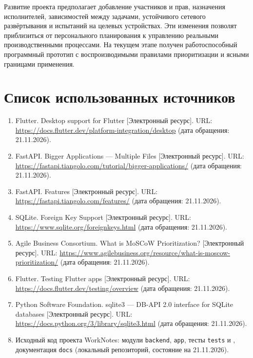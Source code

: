 \documentclass[14pt,a4paper]{extarticle}
\providecommand{\tightlist}{\setlength{\itemsep}{0pt}\setlength{\parskip}{0pt}}
\begin{document}
Развитие проекта предполагает добавление участников и прав, назначения исполнителей, зависимостей между задачами, устойчивого сетевого развёртывания и испытаний на целевых устройствах. Эти изменения позволят приблизиться от персонального планирования к управлению реальными производственными процессами. На текущем этапе получен работоспособный программный прототип с воспроизводимыми правилами приоритизации и ясными границами применения.

\section*{Список использованных источников}

\begin{enumerate}
\def\labelenumi{\arabic{enumi}.}
\tightlist
\item
  Flutter. Desktop support for Flutter {[}Электронный ресурс{]}. URL: \url{https://docs.flutter.dev/platform-integration/desktop} (дата обращения: 21.11.2026).
\item
  FastAPI. Bigger Applications --- Multiple Files {[}Электронный ресурс{]}. URL: \url{https://fastapi.tiangolo.com/tutorial/bigger-applications/} (дата обращения: 21.11.2026).
\item
  FastAPI. Features {[}Электронный ресурс{]}. URL: \url{https://fastapi.tiangolo.com/features/} (дата обращения: 21.11.2026).
\item
  SQLite. Foreign Key Support {[}Электронный ресурс{]}. URL: \url{https://www.sqlite.org/foreignkeys.html} (дата обращения: 21.11.2026).
\item
  Agile Business Consortium. What is MoSCoW Prioritization? {[}Электронный ресурс{]}. URL: \url{https://www.agilebusiness.org/resource/what-is-moscow-prioritization/} (дата обращения: 21.11.2026).
\item
  Flutter. Testing Flutter apps {[}Электронный ресурс{]}. URL: \url{https://docs.flutter.dev/testing/overview} (дата обращения: 21.11.2026).
\item
  Python Software Foundation. sqlite3 --- DB-API 2.0 interface for SQLite databases {[}Электронный ресурс{]}. URL: \url{https://docs.python.org/3/library/sqlite3.html} (дата обращения: 21.11.2026).
\item
  Исходный код проекта WorkNotes: модули \texttt{backend}, \texttt{app}, тесты \texttt{tests} и , документация \texttt{docs} (локальный репозиторий, состояние на 21.11.2026).
\end{enumerate}
\end{document}
